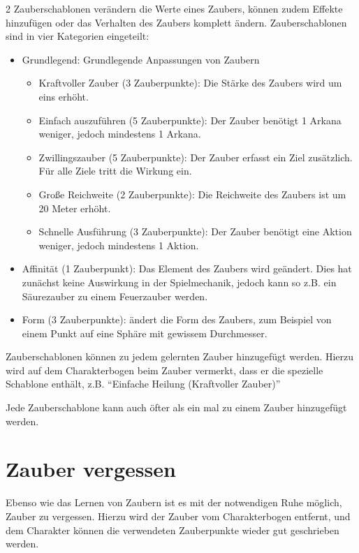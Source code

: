 \begin{multicols}{2}
Zauberschablonen verändern die Werte eines Zaubers, können zudem Effekte hinzufügen oder das Verhalten des Zaubers komplett ändern. Zauberschablonen sind in vier Kategorien eingeteilt:
\begin{itemize}
    \item Grundlegend: Grundlegende Anpassungen von Zaubern
    \begin{itemize}
        \item Kraftvoller Zauber (3 Zauberpunkte): Die Stärke des Zaubers wird um eins erhöht.
        \item Einfach auszuführen (5 Zauberpunkte): Der Zauber benötigt 1 Arkana weniger, jedoch mindestens 1 Arkana.
        \item Zwillingszauber (5 Zauberpunkte): Der Zauber erfasst ein Ziel zusätzlich. Für alle Ziele tritt die Wirkung ein.
        \item Große Reichweite (2 Zauberpunkte): Die Reichweite des Zaubers ist um 20 Meter erhöht.
        \item Schnelle Ausführung (3 Zauberpunkte): Der Zauber benötigt eine Aktion weniger, jedoch mindestens 1 Aktion.
    \end{itemize}
    \item Affinität (1 Zauberpunkt): Das Element des Zaubers wird geändert. Dies hat zunächst keine Auswirkung in der Spielmechanik, jedoch kann so z.B. ein Säurezauber zu einem Feuerzauber werden.
    \item Form (3 Zauberpunkte): ändert die Form des Zaubers, zum Beispiel von einem Punkt auf eine Sphäre mit gewissem Durchmesser.
\end{itemize}

Zauberschablonen können zu jedem gelernten Zauber hinzugefügt werden. Hierzu wird auf dem Charakterbogen beim Zauber vermerkt, dass er die spezielle Schablone enthält, z.B. ``Einfache Heilung (Kraftvoller Zauber)''

Jede Zauberschablone kann auch öfter als ein mal zu einem Zauber hinzugefügt werden.

\section{Zauber vergessen}

Ebenso wie das Lernen von Zaubern ist es mit der notwendigen Ruhe möglich, Zauber zu vergessen. Hierzu wird der Zauber vom Charakterbogen entfernt, und dem Charakter können die verwendeten Zauberpunkte wieder gut geschrieben werden.


\end{multicols}
